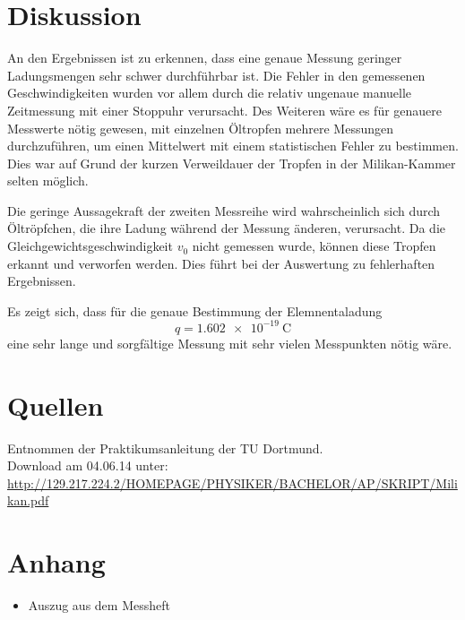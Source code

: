 \documentclass[11pt,ngerman,a4paper]{article}
\begin{document}
\section{Diskussion}
An den Ergebnissen ist zu erkennen, dass eine genaue Messung geringer Ladungsmengen sehr schwer durchführbar ist. Die Fehler in den gemessenen Geschwindigkeiten wurden vor allem durch die relativ ungenaue manuelle Zeitmessung mit einer Stoppuhr verursacht. Des Weiteren wäre es für genauere Messwerte nötig gewesen, mit einzelnen Öltropfen mehrere Messungen durchzuführen, um einen Mittelwert mit einem statistischen Fehler zu bestimmen. Dies war auf Grund der kurzen Verweildauer der Tropfen in der Milikan-Kammer selten möglich.

\noindent
Die geringe Aussagekraft der zweiten Messreihe wird wahrscheinlich sich durch Öltröpfchen, die ihre Ladung während der Messung änderen, verursacht. Da die Gleichgewichtsgeschwindigkeit $v_0$ nicht gemessen wurde, können diese Tropfen erkannt und verworfen werden. Dies führt bei der Auswertung zu fehlerhaften Ergebnissen.

\noindent
Es zeigt sich, dass für die genaue Bestimmung der Elemnentaladung
\[
q = \SI{1.602e-19}{\coulomb}
\]
eine sehr lange und sorgfältige Messung mit sehr vielen Messpunkten nötig wäre.
\section{Quellen}
\begin{enumerate}[{[}1{]}]
\item Entnommen der Praktikumsanleitung \textit{} der TU Dortmund. \\
Download am 04.06.14 unter:\\
 \url{http://129.217.224.2/HOMEPAGE/PHYSIKER/BACHELOR/AP/SKRIPT/Milikan.pdf}
\end{enumerate}
\section{Anhang}
\begin{itemize}
\item Auszug aus dem Messheft
\end{itemize}
\end{document}
